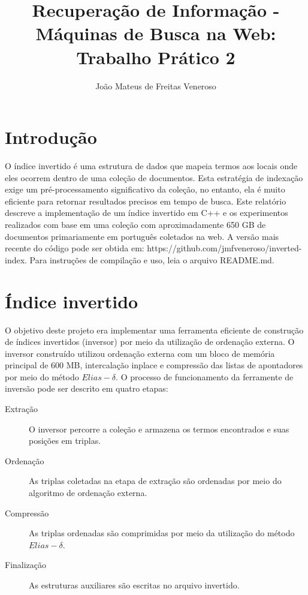 \documentclass{report}
\begin{document}
\title{Recuperação de Informação - Máquinas de Busca na Web: Trabalho Prático 2}
\author{João Mateus de Freitas Veneroso}

\maketitle

\tableofcontents

\chapter{Introdução}

O índice invertido é uma estrutura de dados que mapeia termos aos locais onde eles ocorrem
dentro de uma coleção de documentos. Esta estratégia de indexação exige um pré-processamento
significativo da coleção, no entanto, ela é muito eficiente para retornar resultados precisos
em tempo de busca. Este relatório descreve a implementação de um índice invertido em C++ e
os experimentos realizados com base em uma coleção com aproximadamente 650 GB de documentos
primariamente em português coletados na web. A versão mais recente do código pode ser obtida
em: https://github.com/jmfveneroso/inverted-index. Para instruções de compilação e uso, leia
o arquivo README.md. 

\chapter{Índice invertido}
O objetivo deste projeto era implementar uma ferramenta eficiente de construção de índices 
invertidos (inversor) por meio da utilização de ordenação externa. O inversor construído
utilizou ordenação externa com um bloco de memória principal de 600 MB, intercalação
inplace e compressão das listas de apontadores por meio do método $ Elias-\delta $. O processo
de funcionamento da ferramente de inversão pode ser descrito em quatro etapas:

\begin{description}
  \item [Extração]    O inversor percorre a coleção e armazena os termos encontrados e suas posições em triplas.
  \item [Ordenação]   As triplas coletadas na etapa de extração são ordenadas por meio do algoritmo de ordenação externa.
  \item [Compressão]  As triplas ordenadas são comprimidas por meio da utilização do método $ Elias-\delta $.
  \item [Finalização] As estruturas auxiliares são escritas no arquivo invertido.
\end{description}
\end{document}
